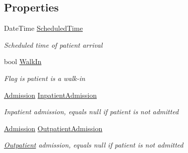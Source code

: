 \subsection*{Properties}
\begin{DoxyCompactItemize}
\item 
Date\+Time \hyperlink{class_general_health_care_elements_1_1_department_models_1_1_outpatient_1_1_outpatient_path_af80acd93c354794b7b64fc5668e2a1d6}{Scheduled\+Time}
\begin{DoxyCompactList}\small\item\em Scheduled time of patient arrival \end{DoxyCompactList}\item 
bool \hyperlink{class_general_health_care_elements_1_1_department_models_1_1_outpatient_1_1_outpatient_path_ac02340661c3d2e0766bf5392171140f8}{Walk\+In}
\begin{DoxyCompactList}\small\item\em Flag is patient is a walk-\/in \end{DoxyCompactList}\item 
\hyperlink{class_general_health_care_elements_1_1_treatment_admission_types_1_1_admission}{Admission} \hyperlink{class_general_health_care_elements_1_1_department_models_1_1_outpatient_1_1_outpatient_path_aa7e6e40cf8563dec6b472c7ade3d39bb}{Inpatient\+Admission}
\begin{DoxyCompactList}\small\item\em Inpatient admission, equals null if patient is not admitted \end{DoxyCompactList}\item 
\hyperlink{class_general_health_care_elements_1_1_treatment_admission_types_1_1_admission}{Admission} \hyperlink{class_general_health_care_elements_1_1_department_models_1_1_outpatient_1_1_outpatient_path_a88fafde1a32497d6a6b3dba85777e3fc}{Outpatient\+Admission}
\begin{DoxyCompactList}\small\item\em \hyperlink{namespace_general_health_care_elements_1_1_department_models_1_1_outpatient}{Outpatient} admission, equals null if patient is not admitted \end{DoxyCompactList}\end{DoxyCompactItemize}


